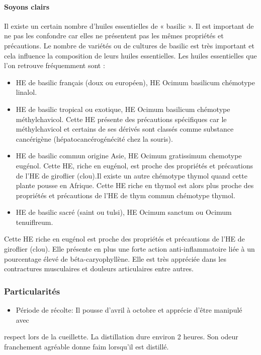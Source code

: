\documentclass[12pt,a4wide]{article}
\begin{document}
\paragraph{Soyons clairs}
\label{sec-4-3-2-3}
Il existe un certain nombre d'huiles essentielles de « basilic ». Il est important de ne pas les confondre car elles ne présentent pas les mêmes propriétés et précautions.
Le nombre de variétés ou de cultures de basilic est très important et cela influence la composition de leurs huiles essentielles.
Les huiles essentielles que l'on retrouve fréquemment sont :
\begin{itemize}
\item HE de basilic français (doux ou européen), HE Ocimum basilicum chémotype linalol.
\item HE  de  basilic  tropical  ou  exotique,  HE  Ocimum  basilicum  chémotype
méthylchavicol.  Cette  HE présente  des  précautions  spécifiques car  le
méthylchavicol et  certains de  ses dérivés  sont classés  comme substance
cancérigène (hépatocancérogénécité chez la souris).
\item HE  de  basilic  commun  origine Asie,  HE  Ocimum  gratissimum  chemotype
eugénol.  Cette  HE,  riche  en  eugénol, est  proche  des  propriétés  et
précautions  de l'HE  de  giroflier (clou).Il  existe  un autre  chémotype
thymol quand cette plante  pousse en  Afrique. Cette HE riche en thymol est
alors plus  proche des propriétés  et précautions  de l'HE de  thym commun
chémotype thymol.
\item HE de basilic sacré (saint ou tulsi), HE Ocimum sanctum ou Ocimum tenuiflreum.
\end{itemize}

Cette HE riche  en eugénol est proche  des propriétés et précautions  de l'HE de
giroflier (clou). Elle présente en plus une forte action anti-inflammatoire liée
à un pourcentage  élevé de béta-caryophyllène. Elle est très  appréciée dans les
contractures musculaires et douleurs articulaires entre autres.


\subsubsection{Particularités}
\label{sec-4-3-3}
\begin{itemize}
\item Période de récolte: Il pousse d'avril à octobre et apprécie d'être manipulé avec
\end{itemize}
respect lors de la cueillette. La  distillation dure environ 2 heures. Son odeur
franchement agréable donne  faim lorsqu'il est distillé.  
\end{document}
